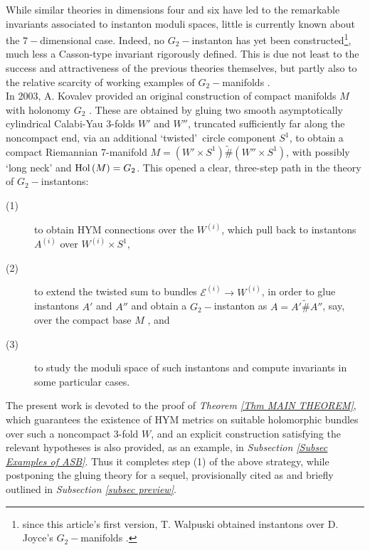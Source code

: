 \documentclass{article}
\newcommand{\ii}{^{(i)}}
\newcommand{\func}[1]{\textnormal {#1\,}}
\newcommand{\mc}[1]{\mathcal{#1}}
\begin{document}
While similar theories in dimensions four \cite{4-manifolds} and six \cite{Thomas} have led to the remarkable invariants associated to instanton moduli spaces, little is currently known about the $7-$dimensional case. Indeed, no $G_{2}-$instanton has yet been constructed\footnote{since this article's first version, T. Walpuski \cite{Walpuski} obtained instantons over D. Joyce's $G_2-$manifolds  \cite{Joyce}. }, much less a Casson-type invariant rigorously defined. This is due not least to the success and
attractiveness of the previous theories themselves, but partly also to the
relative scarcity of working examples of $G_{2}-$manifolds \cite{Bryant}\cite{Bryant-Salamon}\cite{Joyce}.
\\

In 2003, A. Kovalev provided an original construction of compact manifolds $M$
with holonomy $G_{2}$ \cite{kovalevzinho,kovalevzao}. These are obtained by gluing two smooth
asymptotically cylindrical Calabi-Yau 3-folds $W'$ and $W''$, truncated
sufficiently far along the noncompact end, via an additional
`twisted'\ circle component $S^{1}$, to obtain a compact Riemannian 7-manifold $M= \left(
W'\times S^{1}\right) \widetilde{\#}\left( W''\times S^{1}\right)$, with possibly `long neck' and $\func{Hol}(M)=G_2$. This
opened a clear, three-step path in the theory of $G_{2}-$instantons: 
\begin{description}
        \item[(1)]

to obtain HYM connections over the $W\ii$, which pull
back to instantons $A\ii$ over  $W\ii\times S^{1}$,

\item[(2)] 
to extend the twisted sum to bundles $\mc{E}\ii\to W\ii$, in order to glue instantons  $A'$ and $A''$ and obtain a $G_{2}-$instanton as $A=A'\widetilde{\#}A''$, say, over the compact base $M  $ \cite{floer}\cite{Taubes}, and 

\item[(3)] 
to study the moduli space of such instantons and compute
invariants in some particular cases.
\end{description}

The present work  is  devoted to the proof of  \emph{Theorem \ref{Thm MAIN THEOREM}}, which guarantees the existence of HYM metrics on suitable holomorphic bundles over such a noncompact 3-fold $W$, and an explicit construction satisfying the relevant hypotheses is also provided, as an example, in \emph{Subsection \ref{Subsec Examples of ASB}}. Thus it completes step (1) of the
above strategy, while postponing the gluing theory for a sequel, provisionally cited as \cite{G2II} and briefly outlined in \emph{Subsection \ref{subsec preview}}.
\end{document}
